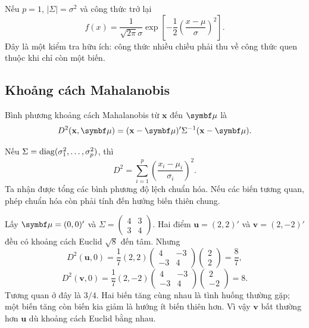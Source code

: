 Nếu $p=1$, $|\Sigma|=\sigma^2$ và công thức trở lại
\[
 f(x)=\frac1{\sqrt{2\pi}\sigma}
 \exp\left[-\frac12\left(\frac{x-\mu}{\sigma}\right)^2\right].
\]
Đây là một kiểm tra hữu ích: công thức nhiều chiều phải thu về công thức
quen thuộc khi chỉ còn một biến.

\subsection{Khoảng cách Mahalanobis}
\begin{definition}
Bình phương khoảng cách Mahalanobis từ $\mathbf x$ đến $\vmu$ là
\begin{equation}
 D^2(\mathbf x,\vmu)=(\mathbf x-\vmu)'\Sigma^{-1}(\mathbf x-\vmu).
 \label{eq:mahalanobis}
\end{equation}
\end{definition}
Nếu $\Sigma=\operatorname{diag}(\sigma_1^2,\ldots,\sigma_p^2)$, thì
\[
 D^2=\sum_{i=1}^p\left(\frac{x_i-\mu_i}{\sigma_i}\right)^2.
\]
Ta nhận được tổng các bình phương độ lệch chuẩn hóa. Nếu các biến tương
quan, phép chuẩn hóa còn phải tính đến hướng biến thiên chung.

\begin{example}
Lấy $\vmu=(0,0)'$ và $\Sigma=\begin{pmatrix}4&3\\3&4\end{pmatrix}$.
Hai điểm $\mathbf u=(2,2)'$ và $\mathbf v=(2,-2)'$ đều có khoảng cách
Euclid $\sqrt8$ đến tâm. Nhưng
\[
 D^2(\mathbf u,0)=\frac17(2,2)
 \begin{pmatrix}4&-3\\-3&4\end{pmatrix}\begin{pmatrix}2\\2\end{pmatrix}
 =\frac87,
\]
\[
 D^2(\mathbf v,0)=\frac17(2,-2)
 \begin{pmatrix}4&-3\\-3&4\end{pmatrix}\begin{pmatrix}2\\-2\end{pmatrix}
 =8.
\]
Tương quan ở đây là $3/4$. Hai biến tăng cùng nhau là tình huống thường gặp;
một biến tăng còn biến kia giảm là hướng ít biến thiên hơn.
Vì vậy $\mathbf v$ bất thường hơn $\mathbf u$ dù khoảng cách Euclid bằng nhau.
\end{example}

